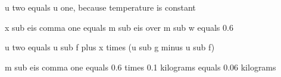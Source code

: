 u two equals u one, because temperature is constant

x sub eis comma one equals m sub eis over m sub w equals 0.6

u two equals u sub f plus x times (u sub g minus u sub f)

m sub eis comma one equals 0.6 times 0.1 kilograms equals 0.06 kilograms